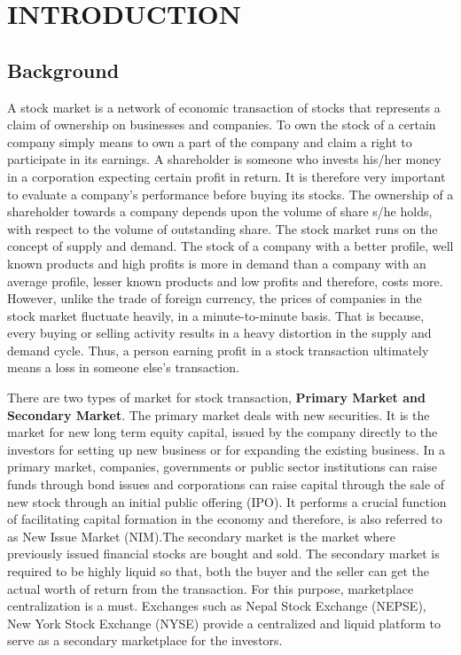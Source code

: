 \section{INTRODUCTION}


\subsection{Background}
A stock market is a network of economic transaction of stocks that represents a claim of ownership on businesses and companies. To own the stock of a certain company simply means to own a part of the company and claim a right to participate in its earnings. A shareholder is someone who invests his/her money in a corporation expecting certain profit in return. It is therefore very important to evaluate a company's performance before buying its stocks. 
The ownership of a shareholder towards a company depends upon the volume of share s/he holds, with respect to the volume of outstanding share. The stock market runs on the concept of supply and demand. The stock of a company with a better profile, well known products and high profits is more in demand than a company with an average profile, lesser known products and low profits and therefore, costs more. However, unlike the trade of foreign currency, the prices of companies in the stock market fluctuate heavily, in a minute-to-minute basis. That is because, every buying or selling activity results in a heavy distortion in the supply and demand cycle. Thus, a person earning profit in a stock transaction ultimately means a loss in someone else's transaction. 

There are two types of market for stock transaction, \textbf{Primary Market and Secondary Market}. The primary market deals with new securities. It is the market for new long term equity capital, issued by the company directly to the investors for setting up new business or for expanding the existing business. \cite{wiki} In a primary market, companies, governments or public sector institutions can raise funds through bond issues and corporations can raise capital through the sale of new stock through an initial public offering (IPO). It performs a crucial function of facilitating capital formation in the economy and therefore, is also referred to as New Issue Market (NIM).The secondary market is the market where previously issued financial stocks are bought and sold. The secondary market is required to be highly liquid so that, both the buyer and the seller can get the actual worth of return from the transaction. For this purpose, marketplace centralization is a must. Exchanges such as Nepal Stock Exchange (NEPSE), New York Stock Exchange (NYSE) provide a centralized and liquid platform to serve as a secondary marketplace for the investors. 

